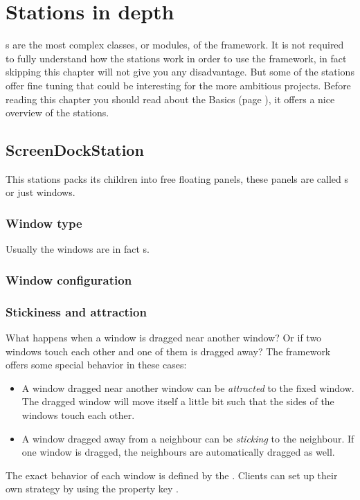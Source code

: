 \section{Stations in depth}
s are the most complex classes, or modules, of the framework. It is not required to fully understand how the stations work in order to use the framework, in fact skipping this chapter will not give you any disadvantage. But some of the stations offer fine tuning that could be interesting for the more ambitious projects. Before reading this chapter you should read about the Basics (page \pageref{sec:basics}), it offers a nice overview of the stations.

\subsection{ScreenDockStation}
This stations packs its children into free floating panels, these panels are called s or just windows.

\subsubsection{Window type}
Usually the windows are in fact s. 

\subsubsection{Window configuration}


\subsubsection{Stickiness and attraction}
What happens when a window is dragged near another window? Or if two windows touch each other and one of them is dragged away? The framework offers some special behavior in these cases:
\begin{itemize}
 \item A window dragged near another window can be \emph{attracted} to the fixed window. The dragged window will move itself a little bit such that the sides of the windows touch each other.
 \item A window dragged away from a neighbour can be \emph{sticking} to the neighbour. If one window is dragged, the neighbours are automatically dragged as well.
\end{itemize}
The exact behavior of each window is defined by the . Clients can set up their own strategy by using the property key \newline {}.

